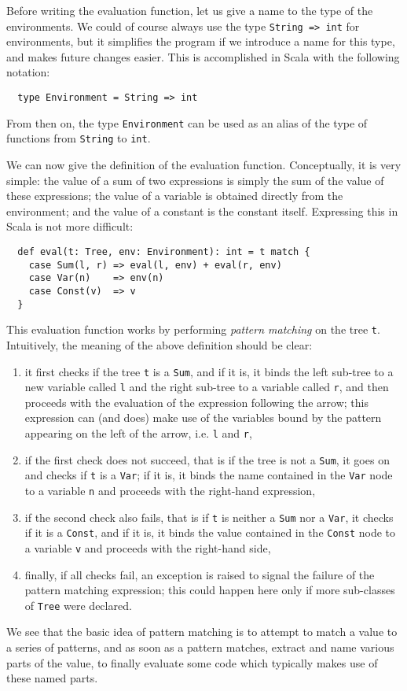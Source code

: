 \documentclass[a4paper,11pt,twoside,titlepage]{article}
\begin{document}
Before writing the evaluation function, let us give a name to the type
of the environments. We could of course always use the type
\lstinline?String => int? for environments, but it simplifies the program
if we introduce a name for this type, and makes future changes easier.
This is accomplished in Scala with the following notation:
\begin{lstlisting}
  type Environment = String => int
\end{lstlisting}
From then on, the type \lstinline?Environment? can be used as an alias of
the type of functions from \lstinline?String? to \lstinline?int?.

We can now give the definition of the evaluation function.
Conceptually, it is very simple: the value of a sum of two expressions
is simply the sum of the value of these expressions; the value of a
variable is obtained directly from the environment; and the value of a
constant is the constant itself. Expressing this in Scala is not more
difficult:
\begin{lstlisting}
  def eval(t: Tree, env: Environment): int = t match {
    case Sum(l, r) => eval(l, env) + eval(r, env)
    case Var(n)    => env(n)
    case Const(v)  => v
  }
\end{lstlisting}
This evaluation function works by performing \emph{pattern matching}
on the tree \lstinline?t?. Intuitively, the meaning of the above definition
should be clear:
\begin{enumerate}
\item it first checks if the tree \lstinline?t? is a \lstinline?Sum?, and if it
  is, it binds the left sub-tree to a new variable called \lstinline?l? and
  the right sub-tree to a variable called \lstinline?r?, and then proceeds
  with the evaluation of the expression following the arrow; this
  expression can (and does) make use of the variables bound by the
  pattern appearing on the left of the arrow, i.e. \lstinline?l? and
  \lstinline?r?,
\item if the first check does not succeed, that is if the tree is not
  a \lstinline?Sum?, it goes on and checks if \lstinline?t? is a \lstinline?Var?; if
  it is, it binds the name contained in the \lstinline?Var? node to a
  variable \lstinline?n? and proceeds with the right-hand expression,
\item if the second check also fails, that is if \lstinline?t? is neither a
  \lstinline?Sum? nor a \lstinline?Var?, it checks if it is a \lstinline?Const?, and
  if it is, it binds the value contained in the \lstinline?Const? node to a
  variable \lstinline?v? and proceeds with the right-hand side,
\item finally, if all checks fail, an exception is raised to signal
  the failure of the pattern matching expression; this could happen
  here only if more sub-classes of \lstinline?Tree? were declared.
\end{enumerate}
We see that the basic idea of pattern matching is to attempt to match
a value to a series of patterns, and as soon as a pattern matches,
extract and name various parts of the value, to finally evaluate some
code which typically makes use of these named parts.
\end{document}

